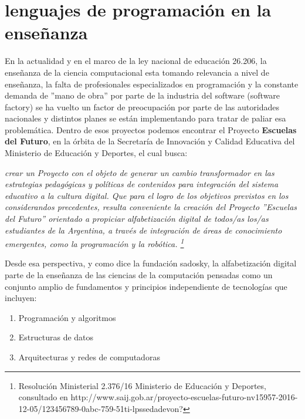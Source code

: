 \section{lenguajes de programación en la enseñanza}

En la actualidad y en el marco de la ley nacional de educación 26.206, la enseñanza de la ciencia computacional esta tomando relevancia a nivel de enseñanza, la falta de profesionales especializados en programación y la constante demanda de ''mano de obra'' por parte de la industria del software (software factory) se ha vuelto un factor de preocupación por parte de las autoridades nacionales y distintos planes se están implementando para tratar de paliar esa problemática. Dentro de esos proyectos podemos encontrar el Proyecto \textbf{Escuelas del Futuro}, en la órbita de la Secretaría de Innovación y Calidad Educativa del Ministerio de Educación y Deportes, el cual busca: 

\begin{center}
\textit{
crear un Proyecto con el objeto de generar un cambio transformador en las estrategias pedagógicas y políticas de contenidos para integración del sistema educativo a la cultura digital.
Que para el logro de los objetivos previstos en los considerandos precedentes, resulta conveniente la creación del Proyecto ''Escuelas del Futuro'' orientado a propiciar alfabetización digital de todos/as los/as estudiantes de la Argentina, a través de integración de áreas de conocimiento emergentes, como la programación y la robótica. \footnote{Resolución Ministerial 2.376/16 Ministerio de Educación y Deportes, consultado en http://www.saij.gob.ar/proyecto-escuelas-futuro-nv15957-2016-12-05/123456789-0abc-759-51ti-lpssedadevon?}
} 
\end{center}

Desde esa perspectiva, y como dice la fundación sadosky, la alfabetización digital parte de la enseñanza de las ciencias de la computación pensadas como un conjunto amplio de fundamentos y principios independiente de tecnologías  \citep[pág 12]{sadosky2013cc} que incluyen:

\begin{enumerate}
  \item Programación y algoritmos
  \item Estructuras de datos
  \item Arquitecturas y redes de computadoras
\end{enumerate}

